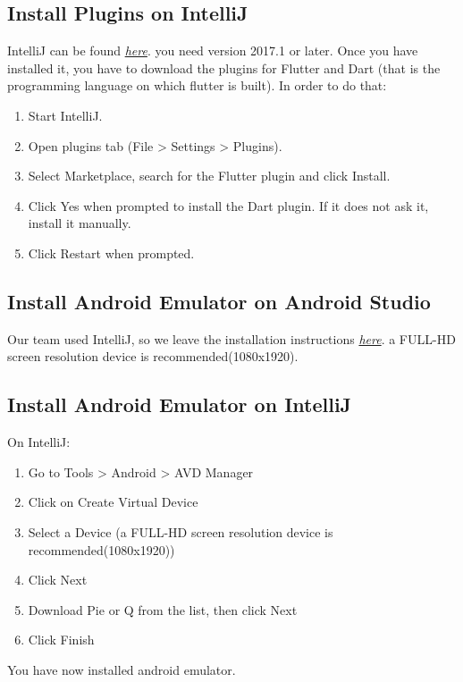 \documentclass[../ITD.tex]{subfiles}
\begin{document}
\subsection{Install Plugins on IntelliJ}\label{subsec:install-plugins-on-intellij}
    IntelliJ can be found \href{https://www.jetbrains.com/idea/download/}{\textit{here}}.
    you need version 2017.1 or later.
    Once you have installed it, you have to download the plugins for Flutter and Dart (that is the programming language on which flutter is built).
    In order to do that:
    \begin{enumerate}
        \item Start IntelliJ.
        \item Open plugins tab (File > Settings > Plugins).
        \item Select Marketplace, search for the Flutter plugin and click Install.
        \item Click Yes when prompted to install the Dart plugin.
        If it does not ask it, install it manually.
        \item Click Restart when prompted.
    \end{enumerate}
\subsection{Install Android Emulator on Android Studio}\label{subsec:install-android-emulator-on-android-studio}
    Our team used IntelliJ, so we leave the installation instructions
    \href{https://docs.expo.io/versions/latest/workflow/android-studio-emulator/}{\textit{here}}.
    a FULL-HD screen resolution device is recommended(1080x1920).
\subsection{Install Android Emulator on IntelliJ}\label{subsec:install-android-emulator-on-intellij}
    On IntelliJ:
    \begin{enumerate}
        \item Go to Tools > Android > AVD Manager
        \item Click on Create Virtual Device
        \item Select a Device (a FULL-HD screen resolution device is recommended(1080x1920))
        \item Click Next
        \item Download Pie or Q from the list, then click Next
        \item Click Finish
    \end{enumerate}
    You have now installed android emulator.
\end{document}
